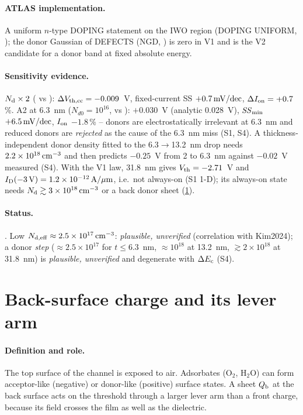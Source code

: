 \paragraph{ATLAS implementation.}
A uniform $n$-type DOPING statement on the IWO region (DOPING UNIFORM, \citealp[p.~1189]{AtlasManual}); the donor
Gaussian of DEFECTS (NGD, \citealp[p.~1171]{AtlasManual}) is zero in V1 and is the V2 candidate for a donor band at
fixed absolute energy.

\paragraph{Sensitivity evidence.}
$N_{\mathrm{d}}\times2$ ( vs ): $\Delta V_{\mathrm{th,cc}} = -0.009$~V, fixed-current SS $+0.7\,\mathrm{mV/dec}$, $\Delta I_{\mathrm{on}} = +0.7$\,\%.
A2 at 6.3~nm ($N_{d0} = 10^{16}$,  vs ): $+0.030$~V (analytic 0.028~V), $\mathit{SS}_{\min}$ $+6.5\,\mathrm{mV/dec}$,
$I_{\mathrm{on}}$ $-1.8$\,\% -- donors are electrostatically irrelevant at 6.3~nm and reduced donors are \emph{rejected} as the
cause of the 6.3~nm miss (S1, S4). A thickness-independent donor density fitted to the 6.3$\rightarrow$13.2~nm drop
needs $2.2\times10^{18}\,\mathrm{cm}^{-3}$ and then predicts $-0.25$~V from 2 to 6.3~nm against $-0.02$~V measured (S4). With the
V1 law, 31.8~nm gives $V_{\mathrm{th}} = -2.71$~V and $I_{\mathrm{D}}(-3\,\mathrm{V}) = 1.2\times10^{-12}\,\mathrm{A}/\mu\mathrm{m}$, i.e.\ not always-on (S1 1-D);
its always-on state needs $N_{\mathrm{d}} \gtrsim 3\times10^{18}\,\mathrm{cm}^{-3}$ or a back donor sheet (\cref{sec:par-backq}).

\paragraph{Status.}
. Low $N_{\mathrm{d,eff}} \approx 2.5\times10^{17}\,\mathrm{cm}^{-3}$: \emph{plausible, unverified} (correlation with Kim2024);
a donor \emph{step} ($\approx2.5\times10^{17}$ for $t\le6.3$~nm, $\approx10^{18}$ at 13.2~nm, $\gtrsim2\times10^{18}$ at
31.8~nm) is \emph{plausible, unverified} and degenerate with $\Delta E_{\mathrm{c}}$ (S4).

\section{Back-surface charge and its lever arm}
\label{sec:par-backq}

\paragraph{Definition and role.}
The top surface of the channel is exposed to air. Adsorbates (O$_2$, H$_2$O) can form acceptor-like (negative) or
donor-like (positive) surface states. A sheet $Q_{\mathrm{b}}$ at the back surface acts on the threshold through a larger lever
arm than a front charge, because its field crosses the film as well as the dielectric.

